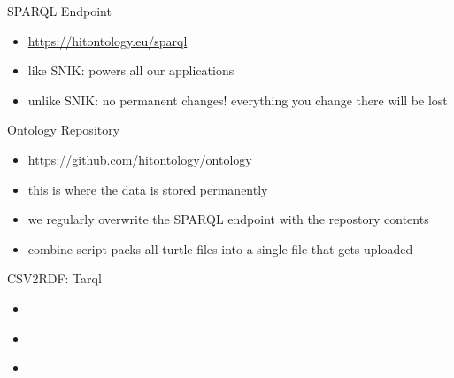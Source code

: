 \documentclass[aspectratio=1610]{beamer}
\begin{document}
\begin{frame}{SPARQL Endpoint}
\centering
\begin{itemize}
\item \url{https://hitontology.eu/sparql}
\item like SNIK: powers all our applications
\item unlike SNIK: no permanent changes! everything you change there will be lost
\end{itemize}
\end{frame}

\begin{frame}{Ontology Repository}
\centering
\begin{itemize}
\item \url{https://github.com/hitontology/ontology}
\item this is where the data is stored permanently
\item we regularly overwrite the SPARQL endpoint with the repostory contents
\item combine script packs all turtle files into a single file that gets uploaded
\end{itemize}
\end{frame}

\begin{frame}{CSV2RDF: Tarql}
\centering
\begin{itemize}
\item
\end{itemize}
\end{frame}

\begin{frame}{}
\centering
\begin{itemize}
\item
\end{itemize}
\end{frame}

\begin{frame}{}
\centering
\begin{itemize}
\item
\end{itemize}
\end{frame}
\end{document}
